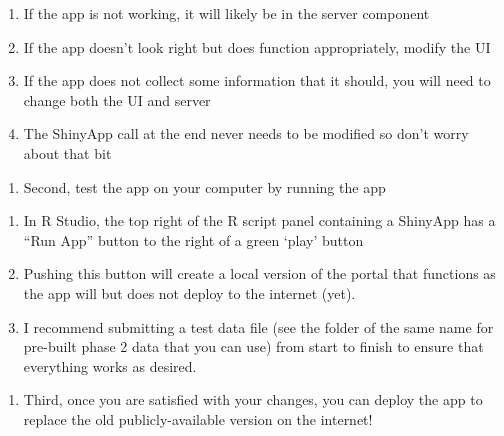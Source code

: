 \documentclass[
  letterpaper,
  DIV=11,
  numbers=noendperiod]{scrreprt}
\providecommand{\tightlist}{%
  \setlength{\itemsep}{0pt}\setlength{\parskip}{0pt}}\usepackage{longtable,booktabs,array}
\begin{document}
\begin{enumerate}
  \begin{enumerate}
  \def\labelenumii{\roman{enumii}.}
  \item
    If the app is not working, it will likely be in the server component
  \item
    If the app doesn't look right but does function appropriately,
    modify the UI
  \item
    If the app does not collect some information that it should, you
    will need to change both the UI and server
  \item
    The ShinyApp call at the end never needs to be modified so don't
    worry about that bit
  \end{enumerate}

  \begin{enumerate}
  \def\labelenumii{\arabic{enumii}.}
  \setcounter{enumii}{1}
  \tightlist
  \item
    Second, test the app on your computer by running the app
  \end{enumerate}

  \begin{enumerate}
  \def\labelenumii{\roman{enumii}.}
  \item
    In R Studio, the top right of the R script panel containing a
    ShinyApp has a ``Run App'' button to the right of a green `play'
    button
  \item
    Pushing this button will create a local version of the portal that
    functions as the app will but does not deploy to the internet (yet).
  \item
    I recommend submitting a test data file (see the folder of the same
    name for pre-built phase 2 data that you can use) from start to
    finish to ensure that everything works as desired.
  \end{enumerate}

  \begin{enumerate}
  \def\labelenumii{\arabic{enumii}.}
  \setcounter{enumii}{2}
  \tightlist
  \item
    Third, once you are satisfied with your changes, you can deploy the
    app to replace the old publicly-available version on the internet!
  \end{enumerate}


\end{enumerate}
\end{document}

